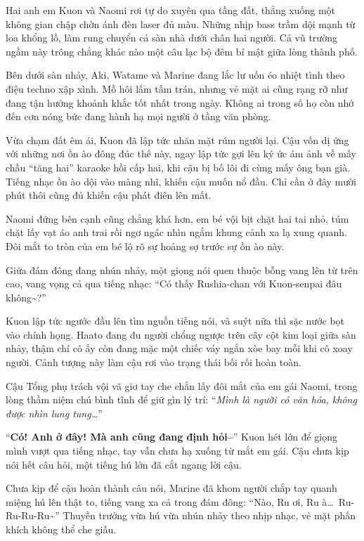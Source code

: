 \documentclass[../main.tex]{subfiles}
\begin{document}
\ct

Hai anh em Kuon và Naomi rơi tự do xuyên qua tầng đất, thẳng xuống một không gian chập chờn ánh đèn laser đủ màu. Những nhịp bass trầm dội mạnh từ loa khổng lồ, làm rung chuyển cả sàn nhà dưới chân hai người. Cả vũ trường ngầm này trông chẳng khác nào một câu lạc bộ đêm bí mật giữa lòng thành phố.


Bên dưới sàn nhảy, Aki, Watame và Marine đang lắc lư uốn éo nhiệt tình theo điệu techno xập xình. Mồ hôi lấm tấm trán, nhưng vẻ mặt ai cũng rạng rỡ như đang tận hưởng khoảnh khắc tốt nhất trong ngày. Không ai trong số họ còn nhớ đến cơn nóng bức đang hành hạ mọi người ở tầng văn phòng.

Vừa chạm đất êm ái, Kuon đã lập tức nhăn mặt rúm người lại. Cậu vốn dị ứng với những nơi ồn ào đông đúc thế này, ngay lập tức gợi lên ký ức ám ảnh về mấy chầu ``tăng hai'' karaoke hồi cấp hai, khi cậu bị bố lôi đi cùng mấy ông bạn già. Tiếng nhạc ồn ào dội vào màng nhĩ, khiến cậu muốn nổ đầu. Chỉ cần ở đây mười phút thôi cũng đủ khiến cậu phát điên lên mất.

Naomi đứng bên cạnh cũng chẳng khá hơn, em bé vội bịt chặt hai tai nhỏ, túm chặt lấy vạt áo anh trai rồi ngơ ngác nhìn ngắm khung cảnh xa lạ xung quanh. Đôi mắt to tròn của em bé lộ rõ sự hoảng sợ trước sự ồn ào này.

Giữa đám đông đang nhún nhảy, một giọng nói quen thuộc bỗng vang lên từ trên cao, vang vọng cả qua tiếng nhạc: ``Có thấy Rushia-chan với Kuon-senpai đâu không\~{}?''


Kuon lập tức ngước đầu lên tìm nguồn tiếng nói, và suýt nữa thì sặc nước bọt vào chính họng. Haato đang đu người chổng ngược trên cây cột kim loại giữa sàn nhảy, thậm chí cô ấy còn đang mặc một chiếc váy ngắn xòe bay mỗi khi cô xoay người. Cảnh tượng này làm cậu rơi vào trạng thái bối rối hoàn toàn.

Cậu Tổng phụ trách vội vã giơ tay che chắn lấy đôi mắt của em gái Naomi, trong lòng thầm niệm chú bình tĩnh để giữ gìn lý trí: ``\textit{Mình là người có văn hóa, không được nhìn lung tung\dots}''

``\textbf{Có! Anh ở đây! Mà anh cũng đang định hỏi--}'' Kuon hét lớn để giọng mình vượt qua tiếng nhạc, tay vẫn chưa hạ xuống từ mắt em gái. Cậu chưa kịp nói hết câu hỏi, một tiếng hú lớn đã cắt ngang lời cậu.

Chưa kịp để cậu hoàn thành câu nói, Marine đã khom người chắp tay quanh miệng hú lên thật to, tiếng vang xa cả trong đám đông: ``Nào, Ru ơi, Ru à\dots\ Ru-Ru-Ru-Ru\~{}'' Thuyền trưởng vừa hú vừa nhún nhảy theo nhịp nhạc, vẻ mặt phấn khích không thể che giấu.
\end{document}
